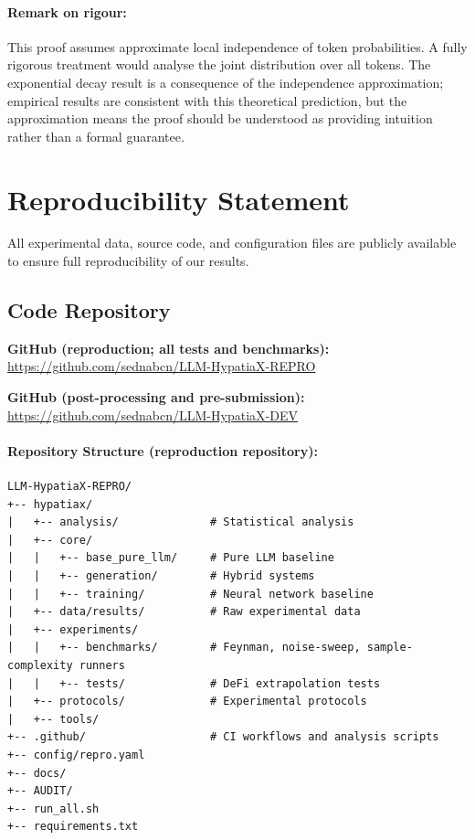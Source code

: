\documentclass[twoside,11pt]{article}
\begin{document}
\paragraph{Remark on rigour:} This proof assumes approximate local independence of token probabilities. A fully rigorous treatment would analyse the joint distribution over all tokens. The exponential decay result is a consequence of the independence approximation; empirical results are consistent with this theoretical prediction, but the approximation means the proof should be understood as providing intuition rather than a formal guarantee\citep{kambhampati2024llms}.



\section{Reproducibility Statement}
\label{app:reproducibility}

All experimental data, source code, and configuration files are publicly
available to ensure full reproducibility of our results.

\subsection{Code Repository}

\textbf{GitHub (reproduction; all tests and benchmarks):}
\url{https://github.com/sednabcn/LLM-HypatiaX-REPRO}

\textbf{GitHub (post-processing and pre-submission):}
\url{https://github.com/sednabcn/LLM-HypatiaX-DEV}

\paragraph{Repository Structure (reproduction repository):}
\begin{small}
\begin{verbatim}
LLM-HypatiaX-REPRO/
+-- hypatiax/
|   +-- analysis/              # Statistical analysis
|   +-- core/
|   |   +-- base_pure_llm/     # Pure LLM baseline
|   |   +-- generation/        # Hybrid systems
|   |   +-- training/          # Neural network baseline
|   +-- data/results/          # Raw experimental data
|   +-- experiments/
|   |   +-- benchmarks/        # Feynman, noise-sweep, sample-complexity runners
|   |   +-- tests/             # DeFi extrapolation tests
|   +-- protocols/             # Experimental protocols
|   +-- tools/
+-- .github/                   # CI workflows and analysis scripts
+-- config/repro.yaml
+-- docs/
+-- AUDIT/
+-- run_all.sh
+-- requirements.txt
\end{verbatim}
\end{small}
\end{document}
